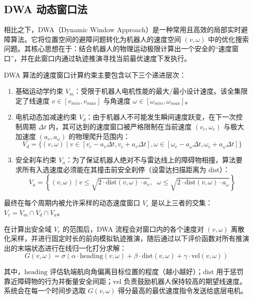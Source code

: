 \documentclass[
  oneside,
  degree=bachelor,
  fullwidthstop=false,
  fontset=fandol,
  times=false,
  minted=true,
  biblatex=true,
]{tongjithesis}
\begin{document}
\subsection{DWA 动态窗口法}
相比之下，DWA（Dynamic Window Approach）是一种常用且高效的局部实时避障算法。它将位置空间的避障问题转化为机器人的速度空间 $(v, \omega)$ 中的优化搜索问题。其核心思想在于：结合机器人的物理运动极限计算出一个安全的“速度窗口”，并在此窗口内通过轨迹推演寻找当前最优速度下发执行。

DWA 算法的速度窗口计算约束主要包含以下三个递进层次：
\begin{enumerate}
    \item 基础运动学约束 $V_m$：受限于机器人电机性能的最大/最小设计速度。该全集限定了线速度 $v \in [v_{min}, v_{max}]$ 与角速度 $\omega \in [\omega_{min}, \omega_{max}]$。
    \item 电机动态加减速约束 $V_d$：由于机器人不可能发生瞬间速度跃变，在下一次控制周期 $\Delta t$ 内，其可达到的速度窗口被严格限制在当前速度 $(v_c, \omega_c)$ 与极大加速度 $(a_v, a_\omega)$ 的物理爬升范围内：
    \begin{equation}
        V_d = \{ (v, \omega) \mid v \in [v_c - a_v \Delta t, v_c + a_v \Delta t], \omega \in [\omega_c - a_\omega \Delta t, \omega_c + a_\omega \Delta t] \}
    \end{equation}
    \item 安全刹车约束 $V_a$：为了保证机器人绝对不与雷达线上的障碍物相撞，算法要求所有入选速度必须能在其撞击前安全刹停（设雷达扫描距离为 $\text{dist}$）：
    \begin{equation}
        V_a = \left\{ (v, \omega) \mid v \le \sqrt{2 \cdot \text{dist}(v, \omega) \cdot a_v}, \;\; \omega \le \sqrt{2 \cdot \text{dist}(v, \omega) \cdot a_\omega} \right\}
    \end{equation}
\end{enumerate}

最终在每个周期内被允许采样的动态速度窗口 $V_r$ 是以上三者的交集：$V_r = V_m \cap V_d \cap V_a$。

在计算出安全域 $V_r$ 的范围后，DWA 流程会对窗口内的各个速度对 $(v, \omega)$ 离散化采样，并进行固定时长的前向模拟轨迹推演，随后通过以下评价函数对所有推演出的末端状态进行在线归一化打分求解：
\begin{equation}
    G(v, \omega) = \sigma \left( \alpha \cdot \text{heading}(v, \omega) + \beta \cdot \text{dist}(v, \omega) + \gamma \cdot \text{vel}(v, \omega) \right)
\end{equation}

其中，$\text{heading}$ 评估轨端航向角偏离目标位置的程度（越小越好）；$\text{dist}$ 用于惩罚靠近障碍物的行为并衡量安全间距；$\text{vel}$ 负责鼓励机器人保持较高的期望线速度。系统会在每一个时间步选取 $G(v, \omega)$ 得分最高的最优速度指令发送给底层电机。
\end{document}
